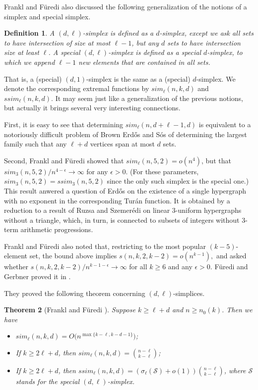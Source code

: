 \documentclass[graybox]{svmult}
\renewcommand{\ge}{\geqslant}
\newcommand{\m}{\mathcal}
\newtheorem{thm}{Theorem}
\newtheorem{defn}[thm]{Definition}
\begin{document}
Frankl and F\"uredi also discussed the following generalization of the notions of a simplex and special simplex.
\begin{defn}
A {\em $(d,\ell)$-simplex} is defined as a $d$-simplex, except we ask all sets to have intersection of size at most $\ell-1$, but any $d$ sets to have intersection size at least $\ell$.   A special {\em $(d,\ell)$-simplex} is defined as a special $d$-simplex, to which we append $\ell-1$ new elements that are contained in all sets.
\end{defn}
That is, a (special) $(d,1)$-simplex is the same as a (special) $d$-simplex. We denote the corresponding extremal functions by $sim_\ell(n,k,d)$ and $ssim_\ell(n,k,d)$. It may seem just like a generalization of the previous notions, but actually it brings several very interesting connections.

First, it is easy to see that determining $sim_\ell(n,d+\ell-1,d)$ is equivalent to a notoriously difficult problem of Brown Erd\H os and S\'os of determining the largest family such that any $\ell+d$ vertices span at most $d$ sets.

Second, Frankl and F\"uredi showed that $sim_\ell(n,5,2)=o(n^4)$, but that $sim_3(n,5,2)/n^{4-\epsilon}\to \infty$ for any $\epsilon>0$. (For these parameters, $sim_3(n,5,2) = ssim_3(n,5,2)$ since the only such simplex is the special one.) This result anwered a question of Erd\H os on the existence of a single hypergraph with no exponent in the corresponding Tur\'an function. It is obtained by a reduction to a result of Ruzsa and Szemer\'edi \cite{RS} on linear $3$-uniform hypergraphs without a triangle, which, in turn, is connected to subsets of integers without $3$-term arithmetic progressions.

Frankl and F\"uredi also noted that, restricting to the most popular $(k-5)$-element set, the bound above implies $s(n,k,2,k-2)=o(n^{k-1}),$ and asked whether $s(n,k,2,k-2)/n^{k-1-\epsilon}\to \infty$ for all $k\ge 6$ and any $\epsilon>0$. F\"uredi and Gerbner proved it in \cite{FG21}.

They proved the following theorem concerning $(d,\ell)$-simplices.

\begin{thm}[Frankl and F\"uredi \cite{FF2}]\label{thmff7}
  Suppose $k\ge \ell+d$ and $n\ge n_0(k)$. Then we have
  \begin{itemize}
    \item[(i)] $sim_\ell(n,k,d) = O\big(n^{\max\{k-\ell, k-d-1\}}\big)$;
    \item[(ii)] If $k\ge 2\ell+d$, then $sim_\ell(n,k,d) ={n-\ell\choose k-\ell}$;
    \item[(iii)] If $k\ge 2\ell+d$, then $ssim_\ell(n,k,d) = (\sigma_{\ell}(\m S)+o(1)){n-\ell\choose k-\ell}$,
        where $\m S$ stands for the special $(d,\ell)$-simplex.
  \end{itemize}
\end{thm}
\end{document}

